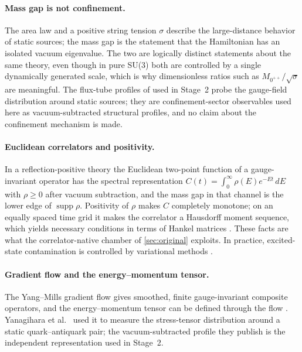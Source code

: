 \documentclass[11pt,a4paper]{article}
\theoremstyle{definition}
\theoremstyle{remark}
\newcommand{\sqs}{\sqrt{\sigma}}
\begin{document}
\paragraph{Mass gap is not confinement.} The area law and a positive string tension $\sigma$ \cite{Wilson74,Bali01,Greensite03} describe the large-distance behavior of static sources; the mass gap is the statement that the Hamiltonian has an isolated vacuum eigenvalue. The two are logically distinct statements about the same theory, even though in pure SU(3) both are controlled by a single dynamically generated scale, which is why dimensionless ratios such as $M_{0^{++}}/\sqs$ are meaningful. The flux-tube profiles of \cite{Cea17,Baker22,Battelli19} used in Stage~2 probe the gauge-field distribution around static sources; they are confinement-sector observables used here as vacuum-subtracted structural profiles, and no claim about the confinement mechanism is made.

\paragraph{Euclidean correlators and positivity.} In a reflection-positive theory \cite{OS73,OS75,GlimmJaffe} the Euclidean two-point function of a gauge-invariant operator has the spectral representation $C(t)=\int_0^\infty\rho(E)e^{-Et}\,dE$ with $\rho\ge0$ after vacuum subtraction, and the mass gap in that channel is the lower edge of $\operatorname{supp}\rho$. Positivity of $\rho$ makes $C$ completely monotone; on an equally spaced time grid it makes the correlator a Hausdorff moment sequence, which yields necessary conditions in terms of Hankel matrices \cite{ShohatTamarkin,Akhiezer}. These facts are what the correlator-native chamber of \cref{sec:original} exploits. In practice, excited-state contamination is controlled by variational methods \cite{LuscherWolff90}.

\paragraph{Gradient flow and the energy--momentum tensor.} The Yang--Mills gradient flow \cite{Luscher10} gives smoothed, finite gauge-invariant composite operators, and the energy--momentum tensor can be defined through the flow \cite{Suzuki13}. Yanagihara et al.\ \cite{Yanagihara19} used it to measure the stress-tensor distribution around a static quark--antiquark pair; the vacuum-subtracted profile they publish is the independent representation used in Stage~2.
\end{document}
